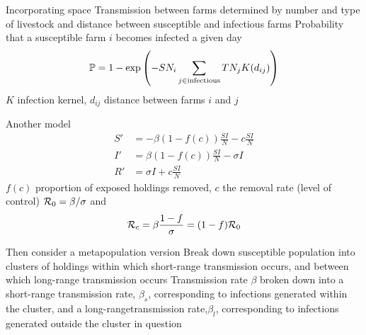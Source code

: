 \documentclass[aspectratio=43]{beamer}
\begin{document}


\begin{frame}{Incorporating space}
	Transmission between farms determined by number and type of livestock and distance between susceptible and infectious farms
	\vfill
	Probability that a susceptible farm $i$ becomes infected a given day
	\begin{equation}
		\mathbb{P} = 1-\exp\left(
			-SN_i\sum_{j\in\text{infectious}}
			TN_jK(d_{ij})
		\right)
	\end{equation}
	$K$ infection kernel, $d_{ij}$ distance between farms $i$ and $j$
\end{frame}



\begin{frame}{Another model}
	\begin{subequations}
		\begin{align}
			S' &= -\beta(1-f(c))\frac{SI}{N}-c\frac{SI}{N} \\
			I' &= \beta(1-f(c))\frac{SI}{N}-\sigma I \\
			R' &= \sigma I+c\frac{SI}{N}
		\end{align}
	\end{subequations}
	\vfill
	$f(c)$ proportion of exposed holdings removed, $c$ the removal rate (level of control)
	\vfill
	$\mathcal{R}_0=\beta/\sigma$ and 
	\[
		\mathcal{R}_c=\beta\frac{1-f}{\sigma}=(1-f)\mathcal{R}_0
	\]
\end{frame}

\begin{frame}{Then consider a metapopulation version}
	Break down susceptible population into clusters of holdings within which short-range transmission occurs, and between which long-range transmission occurs
	\vfill 
	Transmission rate $\beta$  broken  down into a short-range transmission rate, $\beta_s$, corresponding to infections generated within the cluster, and a long-rangetransmission  rate,$\beta_l$,  corresponding  to  infections  generated outside the cluster in question
\end{frame}
\end{document}
